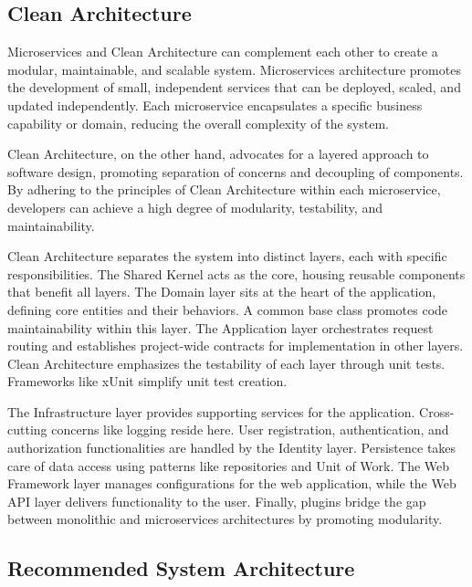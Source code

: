 \subsection{Clean Architecture}

Microservices and Clean Architecture can complement each other to create a
modular, maintainable, and scalable system. Microservices architecture promotes
the development of small, independent services that can be deployed, scaled, and
updated independently. Each microservice encapsulates a specific business
capability or domain, reducing the overall complexity of the system.

Clean Architecture, on the other hand, advocates for a layered approach to
software design, promoting separation of concerns and decoupling of components.
By adhering to the principles of Clean Architecture within each microservice,
developers can achieve a high degree of modularity, testability, and
maintainability.

Clean Architecture separates the system into distinct layers, each with specific
responsibilities. The Shared Kernel acts as the core, housing reusable
components that benefit all layers. The Domain layer sits at the heart of the
application, defining core entities and their behaviors. A common base class
promotes code maintainability within this layer. The Application layer
orchestrates request routing and establishes project-wide contracts for
implementation in other layers. Clean Architecture emphasizes the testability of
each layer through unit tests. Frameworks like xUnit simplify unit test
creation. 

The Infrastructure layer provides supporting services for the application.
Cross-cutting concerns like logging reside here. User registration,
authentication, and authorization functionalities are handled by the Identity
layer. Persistence takes care of data access using patterns like repositories
and Unit of Work. The Web Framework layer manages configurations for the web
application, while the Web API layer delivers functionality to the user.
Finally, plugins bridge the gap between monolithic and microservices
architectures by promoting modularity.

\subsection{Recommended System Architecture}

